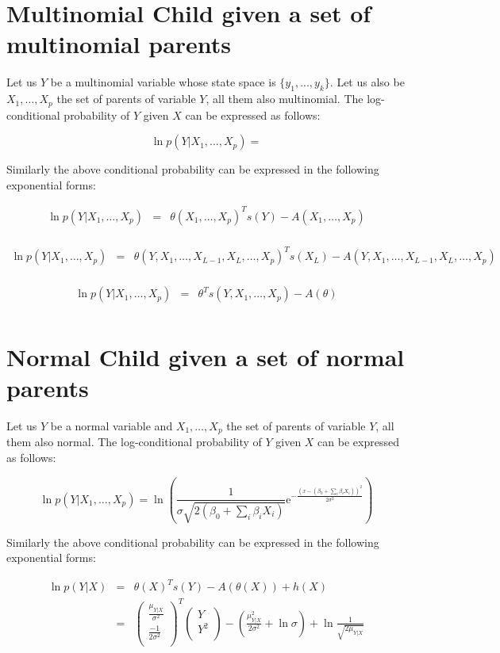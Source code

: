 \documentclass[11pt, oneside]{article}   	%
\newcommand{\me}{\mathrm{e}}
\numberwithin{figure}{section}
\numberwithin{equation}{section}
\numberwithin{table}{section}
\begin{document}
\section{Multinomial Child given a set of multinomial parents}

Let us $Y$ be a multinomial variable whose state space is $\{y_1,...,y_k\}$. Let us also be $X_1,\ldots,X_p$ the set of parents of variable $Y$, all them also multinomial. The log-conditional probability of $Y$ given $X$ can be expressed as follows:

$$ \ln p(Y|X_1,\ldots,X_p) = $$


Similarly the above conditional probability can be expressed in the following exponential forms:

\begin{eqnarray*}
\ln p(Y|X_1,\ldots ,X_p) &=& \theta(X_1,\ldots ,X_p)^Ts(Y) - A(X_1,\ldots ,X_p) \\
\end{eqnarray*}

\begin{eqnarray*}
\ln p(Y|X_1,\ldots ,X_p) &=& \theta(Y, X_1,\ldots ,X_{L-1},X_L, \ldots ,X_p)^T s(X_L) - A(Y, X_1,\ldots ,X_{L-1},X_L, \ldots ,X_p) \\
\end{eqnarray*}


\begin{eqnarray*}
\ln p(Y|X_1,\ldots ,X_p) &=& \theta^Ts(Y,X_1,\ldots ,X_p) - A(\theta) \\
\end{eqnarray*}

\section{Normal Child given a set of normal parents}

Let us $Y$ be a normal variable and $X_1,\ldots,X_p$ the set of parents of variable $Y$, all them also normal. The log-conditional probability of $Y$ given $X$ can be expressed as follows:

$$ \ln p(Y|X_1,\ldots,X_p) = \ln \left(\frac{1}{\sigma \sqrt{2(\beta_0+\sum_i \beta_i X_i )}} \me^{-\frac{(x-(\beta_0+\sum_i \beta_i X_i))^2}{2\sigma^2}} \right)$$


Similarly the above conditional probability can be expressed in the following exponential forms:

\begin{eqnarray*}
\ln p(Y|X) &=& \theta(X)^T s(Y) - A(\theta(X)) + h(X)\\
&=&
\begin{pmatrix}
\frac{\mu_{Y|X}}{\sigma^2}\\
\frac{-1}{2\sigma^2}\\
\end{pmatrix}^T
\begin{pmatrix}
Y\\
Y^2\\
\end{pmatrix}
- \left(\frac{\mu_{Y|X}^2}{2\sigma^2} + \ln{\sigma}\right) + \ln{\frac{1}{\sqrt{2\mu_{Y|X}}}} 
\end{eqnarray*}
\end{document}
